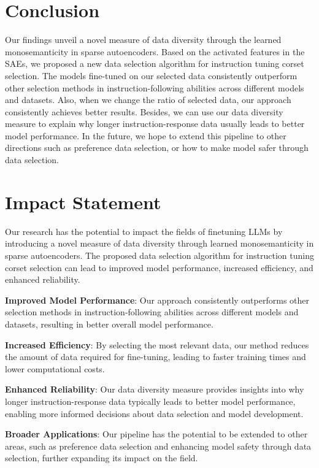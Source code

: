 \section{Conclusion}
 
Our findings unveil a novel measure of data diversity through the learned monosemanticity in sparse autoencoders. Based on the activated features in the SAEs, we proposed a new data selection algorithm for instruction tuning corset selection. The models fine-tuned on our selected data consistently outperform other selection methods in instruction-following abilities across different models and datasets. Also, when we change the ratio of selected data, our approach consistently achieves better results. Besides, we can use our data diversity measure to explain why longer instruction-response data usually leads to better model performance. In the future, we hope to extend this pipeline to other directions such as preference data selection, or how to make model safer through data selection.
 
\section*{Impact Statement}
Our research has the potential to impact the fields of finetuning LLMs by introducing a novel measure of data diversity through learned monosemanticity in sparse autoencoders. The proposed data selection algorithm for instruction tuning corset selection can lead to improved model performance, increased efficiency, and enhanced reliability.

\textbf{Improved Model Performance}: Our approach consistently outperforms other selection methods in instruction-following abilities across different models and datasets, resulting in better overall model performance.

\textbf{Increased Efficiency}: By selecting the most relevant data, our method reduces the amount of data required for fine-tuning, leading to faster training times and lower computational costs.

\textbf{Enhanced Reliability}: Our data diversity measure provides insights into why longer instruction-response data typically leads to better model performance, enabling more informed decisions about data selection and model development.

\textbf{Broader Applications}: Our pipeline has the potential to be extended to other areas, such as preference data selection and enhancing model safety through data selection, further expanding its impact on the field.



